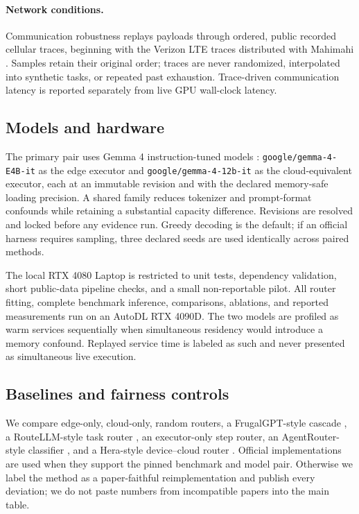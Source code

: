 \documentclass[10pt]{article}
\begin{document}
\paragraph{Network conditions.}
Communication robustness replays payloads through ordered, public recorded
cellular traces, beginning with the Verizon LTE traces distributed with
Mahimahi \citep{netravali2015mahimahi}. Samples retain their original order;
traces are never randomized, interpolated into synthetic tasks, or repeated
past exhaustion. Trace-driven communication latency is reported separately
from live GPU wall-clock latency.

\subsection{Models and hardware}

The primary pair uses Gemma 4 instruction-tuned models
\citep{gemma2026gemma4}: \texttt{google/gemma-4-E4B-it} as the edge executor
and \texttt{google/gemma-4-12b-it} as the cloud-equivalent executor, each at an
immutable revision and with the declared memory-safe loading precision. A shared family reduces tokenizer and prompt-format
confounds while retaining a substantial capacity difference. Revisions are
resolved and locked before any evidence run. Greedy decoding is the default;
if an official harness requires sampling, three declared seeds are used
identically across paired methods.

The local RTX 4080 Laptop is restricted to unit tests, dependency validation,
short public-data pipeline checks, and a small non-reportable pilot. All
router fitting, complete benchmark inference, comparisons, ablations, and
reported measurements run on an AutoDL RTX 4090D. The two models are profiled
as warm services sequentially when simultaneous residency would introduce a
memory confound. Replayed service time is labeled as such and never presented
as simultaneous live execution.

\subsection{Baselines and fairness controls}
\label{sec:baselines}

We compare edge-only, cloud-only, random routers, a FrugalGPT-style cascade
\citep{chen2024frugalgpt}, a RouteLLM-style task router
\citep{ong2025routellm}, an executor-only step router, an AgentRouter-style
classifier \citep{paul2026agentrouter}, and a Hera-style device--cloud router
\citep{zhang2026hera}. Official implementations are used when they support
the pinned benchmark and model pair. Otherwise we label the method as a
paper-faithful reimplementation and publish every deviation; we do not paste
numbers from incompatible papers into the main table.
\end{document}
